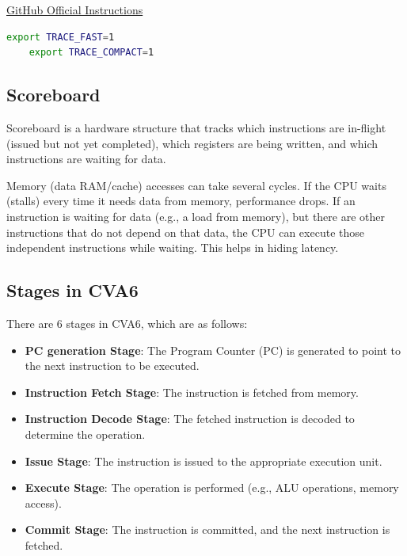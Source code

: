 \documentclass[12pt, a4paper]{article}
\begin{document}
\href{https://github.com/openhwgroup/cva6/blob/e34c5ba68358b26dfe13d0b953e622f2e9f8bebd/tutorials/running_sim.md?plain=1#L91-L123}{GitHub Official Instructions}

\begin{lstlisting}[language=bash, frame=single, basicstyle=\ttfamily\footnotesize, numbers = none]
    export TRACE_FAST=1
    export TRACE_COMPACT=1
\end{lstlisting}

\subsection{Scoreboard}

Scoreboard is a hardware structure that tracks which instructions are in-flight (issued but not yet completed), which registers are being written, and which instructions are waiting for data.

Memory (data RAM/cache) accesses can take several cycles. If the CPU waits (stalls) every time it needs data from memory, performance drops. If an instruction is waiting for data (e.g., a load from memory), but there are other instructions that do not depend on that data, the CPU can execute those independent instructions while waiting. This helps in hiding latency.

\subsection{Stages in CVA6}

There are 6 stages in CVA6, which are as follows:

\begin{itemize}
    \item \textbf{PC generation Stage}: The Program Counter (PC) is generated to point to the next instruction to be executed.
    \item \textbf{Instruction Fetch Stage}: The instruction is fetched from memory.
    \item \textbf{Instruction Decode Stage}: The fetched instruction is decoded to determine the operation.
    \item \textbf{Issue Stage}: The instruction is issued to the appropriate execution unit.
    \item \textbf{Execute Stage}: The operation is performed (e.g., ALU operations, memory access).
    \item \textbf{Commit Stage}: The instruction is committed, and the next instruction is fetched.
\end{itemize}
\end{document}

